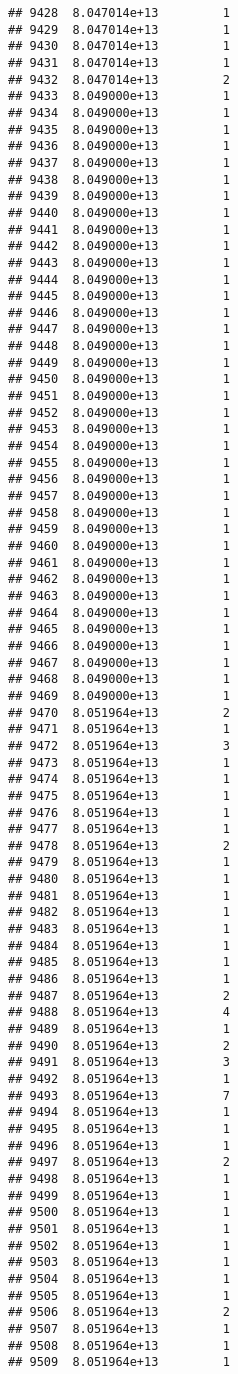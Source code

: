 \documentclass[
]{article}
\begin{document}
\begin{verbatim}
## 9428  8.047014e+13         1
## 9429  8.047014e+13         1
## 9430  8.047014e+13         1
## 9431  8.047014e+13         1
## 9432  8.047014e+13         2
## 9433  8.049000e+13         1
## 9434  8.049000e+13         1
## 9435  8.049000e+13         1
## 9436  8.049000e+13         1
## 9437  8.049000e+13         1
## 9438  8.049000e+13         1
## 9439  8.049000e+13         1
## 9440  8.049000e+13         1
## 9441  8.049000e+13         1
## 9442  8.049000e+13         1
## 9443  8.049000e+13         1
## 9444  8.049000e+13         1
## 9445  8.049000e+13         1
## 9446  8.049000e+13         1
## 9447  8.049000e+13         1
## 9448  8.049000e+13         1
## 9449  8.049000e+13         1
## 9450  8.049000e+13         1
## 9451  8.049000e+13         1
## 9452  8.049000e+13         1
## 9453  8.049000e+13         1
## 9454  8.049000e+13         1
## 9455  8.049000e+13         1
## 9456  8.049000e+13         1
## 9457  8.049000e+13         1
## 9458  8.049000e+13         1
## 9459  8.049000e+13         1
## 9460  8.049000e+13         1
## 9461  8.049000e+13         1
## 9462  8.049000e+13         1
## 9463  8.049000e+13         1
## 9464  8.049000e+13         1
## 9465  8.049000e+13         1
## 9466  8.049000e+13         1
## 9467  8.049000e+13         1
## 9468  8.049000e+13         1
## 9469  8.049000e+13         1
## 9470  8.051964e+13         2
## 9471  8.051964e+13         1
## 9472  8.051964e+13         3
## 9473  8.051964e+13         1
## 9474  8.051964e+13         1
## 9475  8.051964e+13         1
## 9476  8.051964e+13         1
## 9477  8.051964e+13         1
## 9478  8.051964e+13         2
## 9479  8.051964e+13         1
## 9480  8.051964e+13         1
## 9481  8.051964e+13         1
## 9482  8.051964e+13         1
## 9483  8.051964e+13         1
## 9484  8.051964e+13         1
## 9485  8.051964e+13         1
## 9486  8.051964e+13         1
## 9487  8.051964e+13         2
## 9488  8.051964e+13         4
## 9489  8.051964e+13         1
## 9490  8.051964e+13         2
## 9491  8.051964e+13         3
## 9492  8.051964e+13         1
## 9493  8.051964e+13         7
## 9494  8.051964e+13         1
## 9495  8.051964e+13         1
## 9496  8.051964e+13         1
## 9497  8.051964e+13         2
## 9498  8.051964e+13         1
## 9499  8.051964e+13         1
## 9500  8.051964e+13         1
## 9501  8.051964e+13         1
## 9502  8.051964e+13         1
## 9503  8.051964e+13         1
## 9504  8.051964e+13         1
## 9505  8.051964e+13         1
## 9506  8.051964e+13         2
## 9507  8.051964e+13         1
## 9508  8.051964e+13         1
## 9509  8.051964e+13         1

\end{verbatim}
\end{document}
